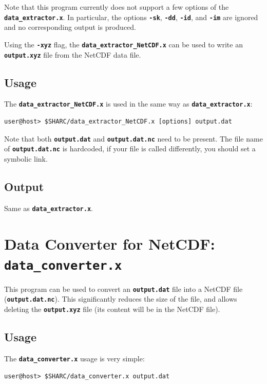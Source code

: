 \documentclass[a4paper,10pt,DIV=15,openany]{scrbook}
\newcommand{\ttt}[1]{\textbf{\texttt{#1}}}
\begin{document}
Note that this program currently does not support a few options of the \ttt{data\_extractor.x}.
In particular, the options \ttt{-sk}, \ttt{-dd}, \ttt{-id}, and \ttt{-im} are ignored and no corresponding output is produced.

Using the \ttt{-xyz} flag, the \ttt{data\_extractor\_NetCDF.x} can be used to write an \ttt{output.xyz} file from the NetCDF data file.

\subsection{Usage}

The \ttt{data\_extractor\_NetCDF.x} is used in the same way as \ttt{data\_extractor.x}:
\begin{verbatim}
user@host> $SHARC/data_extractor_NetCDF.x [options] output.dat
\end{verbatim}
Note that both \ttt{output.dat} and \ttt{output.dat.nc} need to be present.
The file name of \ttt{output.dat.nc} is hardcoded, if your file is called differently, you should set a symbolic link.

\subsection{Output}

Same as \ttt{data\_extractor.x}.




\section{Data Converter for NetCDF: \ttt{data\_converter.x}}\label{sec:data_converter.x}

This program can be used to convert an \ttt{output.dat} file into a NetCDF file (\ttt{output.dat.nc}).
This significantly reduces the size of the file, and allows deleting the \ttt{output.xyz} file (its content will be in the NetCDF file).

\subsection{Usage}

The \ttt{data\_converter.x} usage is very simple:
\begin{verbatim}
user@host> $SHARC/data_converter.x output.dat
\end{verbatim}
\end{document}
